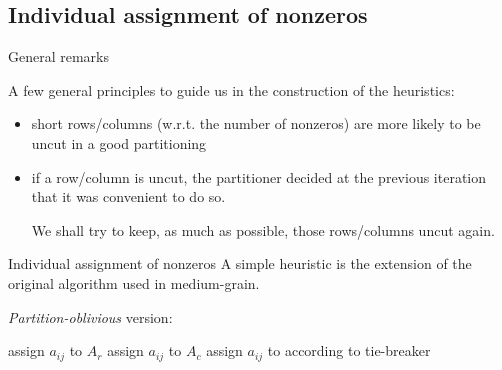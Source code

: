 \subsection{Individual assignment of nonzeros}

\begin{frame}{General remarks}

A few general principles to guide us in the construction of the heuristics:

\begin{itemize}
	\item short rows/columns (w.r.t. the number of nonzeros) are more likely to be uncut in a good partitioning 
	\item if a row/column is uncut, the partitioner decided at the previous iteration that it was convenient to do so. 
		
		We shall try to keep, as much as possible, those rows/columns uncut again.

\end{itemize}


\end{frame}

\begin{frame}{Individual assignment of nonzeros}
A simple heuristic is the extension of the original algorithm used in medium-grain.

\emph{Partition-oblivious} version:

\begin{algorithm}[H]
	\begin{algorithmic}
		\State assign $a_{ij}$ to $A_r$
		\State assign $a_{ij}$ to $A_c$
		\Else
		\State assign $a_{ij}$ to according to tie-breaker
		\EndIf
		\EndFor
	\end{algorithmic}
\end{algorithm}
\end{frame}

